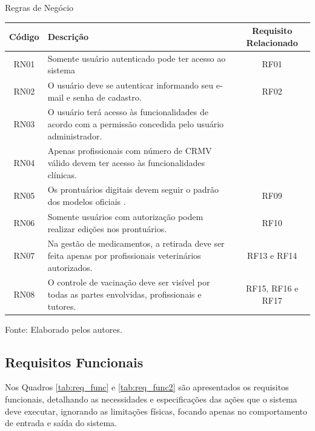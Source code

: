 \documentclass[
    12pt,               %
    openright,          %
    oneside,
    a4paper,            %
    BIBLATEX,           %
    TODO,               %
    english,            %
    brazil              %
    ]{ifsp-spo-inf-ctds}
\begin{document}
            \begin{center}
                \begin{quadro}[H]
                \caption{Regras de Negócio}
                \begin{tabulary}{1.0\textwidth}{|C|p{23em}|C|}
                \hline
                
                 Código & Descrição & Requisito Relacionado\\
                \hline
                RN01 & Somente usuário autenticado pode ter acesso ao sistema & RF01\\
                \hline
                RN02 & O usuário deve se autenticar informando seu e-mail e senha de cadastro. & RF02\\
                \hline
                RN03 & O usuário terá acesso às funcionalidades de acordo com a permissão concedida pelo usuário administrador. & \\
                \hline
                RN04 & Apenas profissionais com número de CRMV válido devem ter acesso às funcionalidades clínicas. & \\
                \hline
                RN05 & Os prontuários digitais devem seguir o padrão dos modelos oficiais . & RF09\\
                \hline
                RN06 & Somente usuários com autorização podem realizar edições nos prontuários. & RF10\\
                \hline
                RN07 & Na gestão de medicamentos, a retirada deve ser feita apenas por profissionais veterinários autorizados. & RF13 e RF14\\
                \hline
                RN08 & O controle de vacinação deve ser visível por todas as partes envolvidas, profissionais e tutores. & RF15, RF16 e RF17\\
                \hline
                \end{tabulary}   
                \label{tab:regra}
                \centering
                \footnotesize {Fonte: Elaborado pelos autores.}
                \end{quadro}
            \end{center}

        \subsection{Requisitos Funcionais}
        
            Nos Quadros \ref{tab:req_func} e \ref{tab:req_func2} são apresentados os requisitos funcionais, detalhando as necessidades e especificações das ações que o sistema deve executar, ignorando as limitações físicas, focando apenas no comportamento de entrada e saída do sistema.
            
\end{document}
